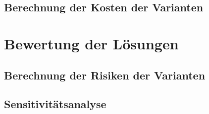	


	\subsection{Berechnung der Kosten der Varianten}
	\label{subsec:Kostenberechnung}
	


\section{Bewertung der Lösungen}
\label{sec:Bewertung}

	\subsection{Berechnung der Risiken der Varianten}
	

	\subsection{Sensitivitätsanalyse}
	

%

